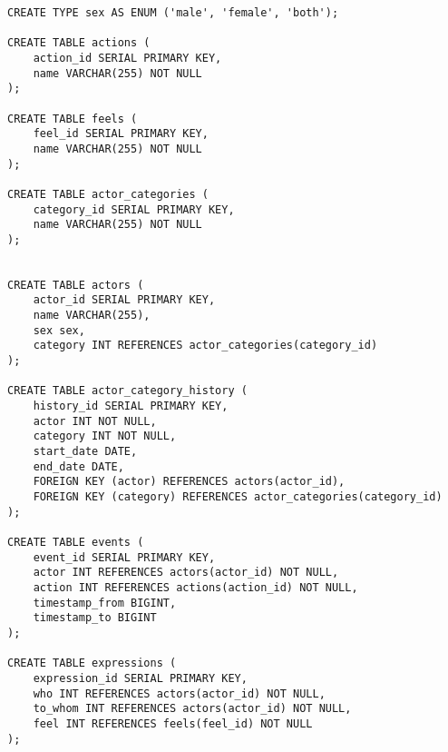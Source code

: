 \begin{verbatim}
CREATE TYPE sex AS ENUM ('male', 'female', 'both');

CREATE TABLE actions (
    action_id SERIAL PRIMARY KEY,
    name VARCHAR(255) NOT NULL
);

CREATE TABLE feels (
    feel_id SERIAL PRIMARY KEY,
    name VARCHAR(255) NOT NULL
);

CREATE TABLE actor_categories (
    category_id SERIAL PRIMARY KEY,
    name VARCHAR(255) NOT NULL
);


CREATE TABLE actors (
    actor_id SERIAL PRIMARY KEY,
    name VARCHAR(255),
    sex sex,
    category INT REFERENCES actor_categories(category_id)
);

CREATE TABLE actor_category_history (
    history_id SERIAL PRIMARY KEY,
    actor INT NOT NULL,
    category INT NOT NULL,
    start_date DATE,
    end_date DATE,
    FOREIGN KEY (actor) REFERENCES actors(actor_id),
    FOREIGN KEY (category) REFERENCES actor_categories(category_id)
);

CREATE TABLE events (
    event_id SERIAL PRIMARY KEY,
    actor INT REFERENCES actors(actor_id) NOT NULL,
    action INT REFERENCES actions(action_id) NOT NULL,
    timestamp_from BIGINT,
    timestamp_to BIGINT
);

CREATE TABLE expressions (
    expression_id SERIAL PRIMARY KEY,
    who INT REFERENCES actors(actor_id) NOT NULL,
    to_whom INT REFERENCES actors(actor_id) NOT NULL,
    feel INT REFERENCES feels(feel_id) NOT NULL
);
\end{verbatim}